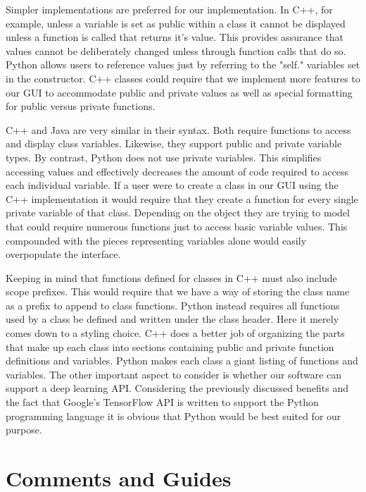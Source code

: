 \documentclass[journal,10pt,onecolumn,compsoc]{IEEEtran} \usepackage[margin=1.0in]{geometry} \usepackage{pdfpages} \usepackage{graphicx}
\begin{document}
\noindent Simpler implementations are preferred for our implementation. 
In C++, for example, unless a variable is set as public within a class it cannot be displayed unless a function is called that returns it's value. \cite{cclass} 
This provides assurance that values cannot be deliberately changed unless through function calls that do so.
Python allows users to reference values just by referring to the "self." variables set in the constructor. \cite{Pythonclass} 
C++ classes could require that we implement more features to our GUI to accommodate public and private values as well as special formatting for public versus private functions.

\noindent C++ and Java are very similar in their syntax. 
Both require functions to access and display class variables. 
Likewise, they support public and private variable types. \cite{cclass} \cite{javaclass} 
By contrast, Python does not use private variables. 
This simplifies accessing values and effectively decreases the amount of code required to access each individual variable. 
If a user were to create a class in our GUI using the C++ implementation it would require that they create a function for every single private variable of that class. 
Depending on the object they are trying to model that could require numerous functions just to access basic variable values.
This compounded with the pieces representing variables alone would easily overpopulate the interface.

\noindent Keeping in mind that functions defined for classes in C++ must also include scope prefixes.
This would require that we have a way of storing the class name as a prefix to append to class functions. 
Python instead requires all functions used by a class be defined and written under the class header. \cite{Pythonclass} 
Here it merely comes down to a styling choice. 
C++ does a better job of organizing the parts that make up each class into sections containing public and private function definitions and variables.
Python makes each class a giant listing of functions and variables.
The other important aspect to consider is whether our software can support a deep learning API. 
Considering the previously discussed benefits and the fact that Google's TensorFlow API is written to support the Python programming language it is obvious that Python would be best suited for our purpose.
\newpage

\section{Comments and Guides} 
\end{document}
